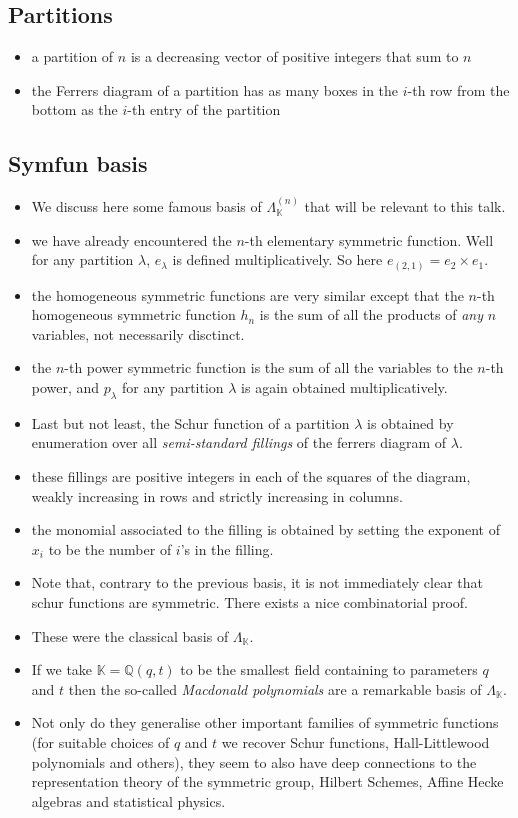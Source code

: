\documentclass[12pt]{article}
\newcommand{\KK}{\mathbb{K}}
\newcommand{\QQ}{\mathbb{Q}}
\begin{document}
    \subsection{Partitions}
    \begin{itemize}
        \item a partition of $n$ is a decreasing vector of positive integers that sum to $n$
        \item the Ferrers diagram of a partition has as many boxes in the $i$-th row from the bottom as the $i$-th entry of the partition
    \end{itemize}
    \subsection{Symfun basis}
    \begin{itemize}
        \item We discuss here some famous basis of $\Lambda_\KK^{(n)}$ that will be relevant to this talk.
        \item we have already encountered the $n$-th elementary symmetric function. Well for any partition $\lambda$, $e_\lambda$ is defined multiplicatively. So here $e_{(2,1)}=e_2 \times e_1$. 
        \item the homogeneous symmetric functions are very similar except that the $n$-th homogeneous symmetric function $h_n$ is the sum of all the products of \emph{any} $n$ variables, not necessarily disctinct.
        \item the $n$-th power symmetric function is the sum of all the variables to the $n$-th power, and $p_\lambda$ for any partition $\lambda$ is again obtained multiplicatively.
        \item Last but not least, the Schur function of a partition $\lambda$ is obtained by enumeration over all \emph{semi-standard fillings} of the ferrers diagram of $\lambda$. 
        \item  these fillings are positive integers in each of the squares of the diagram, weakly increasing in rows and strictly increasing in columns.
        \item the monomial associated to the filling is obtained by setting the exponent of $x_i$ to be the number of $i$'s in the filling.
        \item Note that, contrary to the previous basis, it is not immediately clear that schur functions are symmetric. There exists a nice combinatorial proof. 
        \item These were the classical basis of $\Lambda_\KK$.
        \item If we take $\KK = \QQ(q,t)$ to be the smallest field containing to parameters $q$ and $t$ then the so-called \emph{Macdonald polynomials} are a remarkable basis of $\Lambda_\KK$. 
        \item Not only do they generalise other important families of symmetric functions (for suitable choices of $q$ and $t$ we recover Schur functions, Hall-Littlewood polynomials and others), they seem to also have deep connections to the representation theory of the symmetric group, Hilbert Schemes, Affine Hecke algebras and statistical physics.
    \end{itemize}
\end{document}

